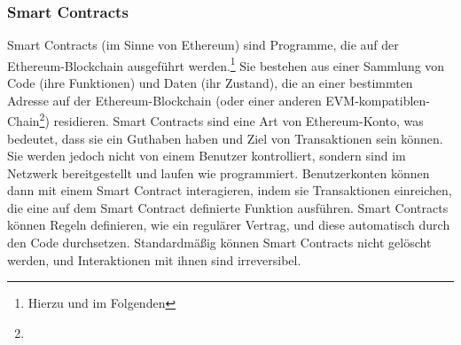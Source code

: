 \subsubsection{Smart Contracts}
\label{sec:definition-smart-contracts}

Smart Contracts (im Sinne von Ethereum) sind Programme, die auf der Ethereum-Blockchain ausgeführt werden.\footnote{
    Hierzu und im Folgenden %
} Sie bestehen aus einer Sammlung von Code (ihre Funktionen) und Daten (ihr Zustand), die an einer bestimmten Adresse auf der Ethereum-Blockchain (oder einer anderen EVM-kompatiblen-Chain\footnote{
}) residieren. Smart Contracts sind eine Art von Ethereum-Konto, was bedeutet, dass sie ein Guthaben haben und Ziel von Transaktionen sein können. Sie werden jedoch nicht von einem Benutzer kontrolliert, sondern sind im Netzwerk bereitgestellt und laufen wie programmiert. Benutzerkonten können dann mit einem Smart Contract interagieren, indem sie Transaktionen einreichen, die eine auf dem Smart Contract definierte Funktion ausführen. 
Smart Contracts können Regeln definieren, wie ein regulärer Vertrag, und diese automatisch durch den Code durchsetzen. Standardmäßig können Smart Contracts nicht gelöscht werden, und Interaktionen mit ihnen sind irreversibel.

